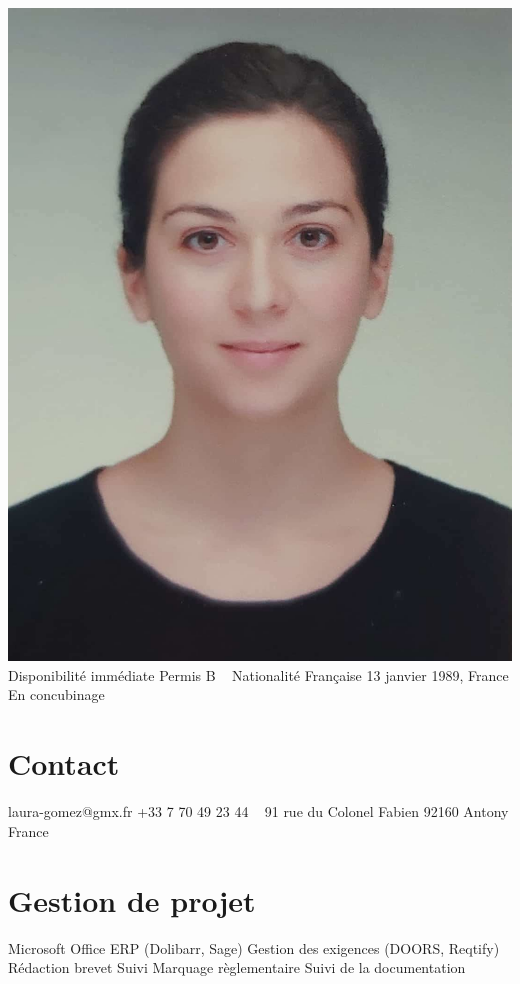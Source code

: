 \documentclass{cv-style}     %
\begin{document}


\begin{aside}
    \includegraphics[width=.8\columnwidth]{img/LG}
    Disponibilité immédiate
    Permis B
    ~
    Nationalité Française
    13 janvier 1989, France
    En concubinage
    \section{Contact}
    laura-gomez@gmx.fr
    +33 7 70 49 23 44
    ~
    91 rue du Colonel Fabien
    92160 Antony
    France
    \section{Gestion de projet}
    Microsoft Office
    ERP (Dolibarr, Sage)
    Gestion des exigences (DOORS, Reqtify)
    ~
    Rédaction brevet
    Suivi Marquage règlementaire
    Suivi de la documentation

\end{aside}
\end{document}
